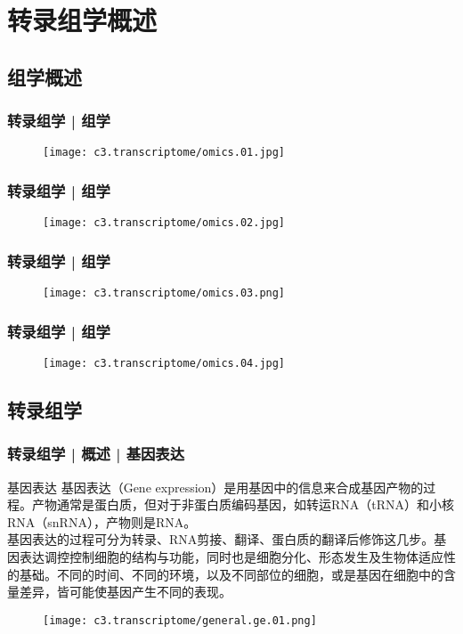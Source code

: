 \section{转录组学概述}
\subsection{组学概述}
\begin{frame}
  \frametitle{转录组学 | 组学}
  \begin{figure}
    \centering
    \texttt{[image: c3.transcriptome/omics.01.jpg]}
  \end{figure}
\end{frame}

\begin{frame}
  \frametitle{转录组学 | 组学}
  \begin{figure}
    \centering
    \texttt{[image: c3.transcriptome/omics.02.jpg]}
  \end{figure}
\end{frame}

\begin{frame}
  \frametitle{转录组学 | 组学}
  \begin{figure}
    \centering
    \texttt{[image: c3.transcriptome/omics.03.png]}
  \end{figure}
\end{frame}

\begin{frame}
  \frametitle{转录组学 | 组学}
  \begin{figure}
    \centering
    \texttt{[image: c3.transcriptome/omics.04.jpg]}
  \end{figure}
\end{frame}

\subsection{转录组学}
\begin{frame}
  \frametitle{转录组学 | 概述 | 基因表达}
  \begin{block}{基因表达}
 基因表达（Gene expression）是用基因中的信息来合成基因产物的过程。产物通常是蛋白质，但对于非蛋白质编码基因，如转运RNA（tRNA）和小核RNA（snRNA），产物则是RNA。\\
 \vspace{0.5em}
基因表达的过程可分为转录、RNA剪接、翻译、蛋白质的翻译后修饰这几步。基因表达调控控制细胞的结构与功能，同时也是细胞分化、形态发生及生物体适应性的基础。不同的时间、不同的环境，以及不同部位的细胞，或是基因在细胞中的含量差异，皆可能使基因产生不同的表现。
  \end{block}
  \begin{figure}
    \centering
    \texttt{[image: c3.transcriptome/general.ge.01.png]}
  \end{figure}
\end{frame}

